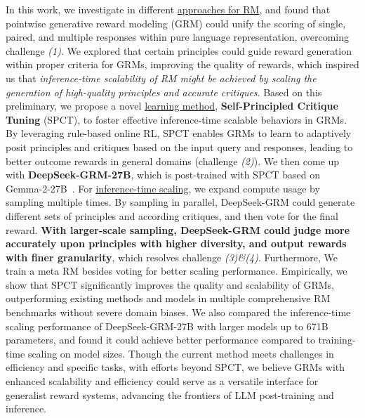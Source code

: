 \documentclass{article} %
\newcommand{\SGRM}{DeepSeek-GRM-27B\xspace}
\newcommand{\SGRMAll}{DeepSeek-GRM\xspace}
\begin{document}
In this work, we investigate in different \uline{approaches for RM}, and found that pointwise generative reward modeling (GRM) could unify the scoring of single, paired, and multiple responses within pure language representation, overcoming challenge \textit{(1)}. We explored that certain principles could guide reward generation within proper criteria for GRMs, improving the quality of rewards, which inspired us that \emph{inference-time scalability of RM might be achieved by scaling the generation of high-quality principles and accurate critiques}. Based on this preliminary, we propose a novel \uline{learning method}, \textbf{Self-Principled Critique Tuning} (SPCT), to foster effective inference-time scalable behaviors in GRMs. By leveraging rule-based online RL, SPCT enables GRMs to learn to adaptively posit principles and critiques based on the input query and responses, leading to better outcome rewards in general domains (challenge \textit{(2)}). 
We then come up with \textbf{\SGRM}, which is post-trained with SPCT based on Gemma-2-27B~\citep{gemmateam2024gemma2improvingopen}. 
For \uline{inference-time scaling}, we expand compute usage by sampling multiple times. By sampling in parallel, \SGRMAll could generate different sets of principles and according critiques, and then vote for the final reward. \textbf{With larger-scale sampling, \SGRMAll could judge more accurately upon principles with higher diversity, and output rewards with finer granularity}, which resolves challenge \textit{(3)\&(4)}.  
Furthermore, We train a meta RM besides voting for better scaling performance. Empirically, we show that SPCT significantly improves the quality and scalability of GRMs, outperforming existing methods and models in multiple comprehensive RM benchmarks without severe domain biases. We also compared the inference-time scaling performance of \SGRM with larger models up to 671B parameters, and found it could achieve better performance compared to training-time scaling on model sizes. 
Though the current method meets challenges in efficiency and specific tasks, 
with efforts beyond SPCT, we believe GRMs with enhanced scalability and efficiency could serve as a versatile interface for generalist reward systems, advancing the frontiers of LLM post-training and inference. 
\end{document}
